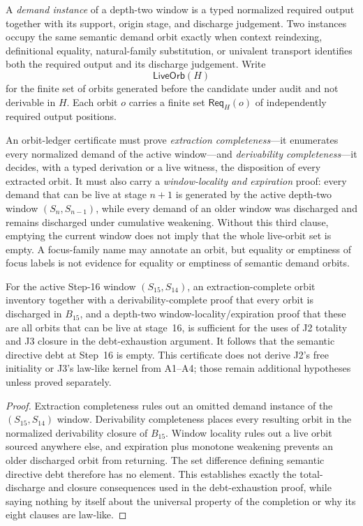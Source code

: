 \begin{definition}
\label{def:semantic-demand-orbits}
A \emph{demand instance} of a depth-two window is a typed normalized required
output together with its support, origin stage, and discharge judgement. Two
instances occupy the same semantic demand orbit exactly when context
reindexing, definitional equality, natural-family substitution, or univalent
transport identifies both the required output and its discharge judgement.
Write
\[
  \mathsf{LiveOrb}(H)
\]
for the finite set of orbits generated before the candidate under audit and not
derivable in \(H\). Each orbit \(o\) carries a finite set
\(\mathsf{Req}_H(o)\) of independently required output positions.

An orbit-ledger certificate must prove \emph{extraction completeness}---it
enumerates every normalized demand of the active window---and
\emph{derivability completeness}---it decides, with a typed derivation or a
live witness, the disposition of every extracted orbit. It must also carry a
\emph{window-locality and expiration} proof: every demand that can be live at
stage \(n+1\) is generated by the active depth-two window
\((S_n,S_{n-1})\), while every demand of an older window was discharged and
remains discharged under cumulative weakening. Without this third clause,
emptying the current window does not imply that the whole live-orbit set is
empty. A focus-family name may annotate an orbit, but equality or emptiness of
focus labels is not evidence for equality or emptiness of semantic demand
orbits.
\end{definition}

\begin{proposition}
\label{prop:orbit-ledger-j2-j3}
For the active Step-16 window \((S_{15},S_{14})\), an
extraction-complete orbit inventory together with a
derivability-complete proof that every orbit is discharged in \(B_{15}\), and
a depth-two window-locality/expiration proof that these are all orbits that can
be live at stage~16, is sufficient for the uses of J2 totality and J3 closure
in the debt-exhaustion argument. It follows that the semantic directive debt
at Step~16 is empty.
This certificate does not derive J2's free initiality or J3's law-like kernel
from A1--A4; those remain additional hypotheses unless proved separately.
\end{proposition}

\begin{proof}
Extraction completeness rules out an omitted demand instance of the
\((S_{15},S_{14})\) window. Derivability completeness places every resulting
orbit in the normalized derivability closure of \(B_{15}\). Window locality
rules out a live orbit sourced anywhere else, and expiration plus monotone
weakening prevents an older discharged orbit from returning. The set difference
defining semantic directive debt therefore has no element. This establishes
exactly the total-discharge and closure consequences used in the debt-exhaustion
proof, while saying nothing by itself about the universal property of the
completion or why its eight clauses are law-like.
\end{proof}

